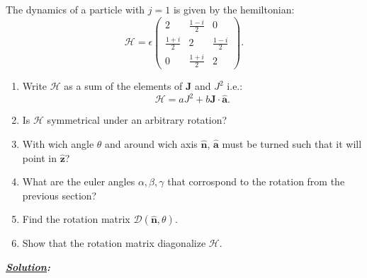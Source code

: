 \documentclass[notitlepage]{report}
\begin{document}
\begin{question}[title = Question 6]{}{}
The dynamics of a particle with  $j=1$ is given by the hemiltonian:\\
\[
	\mathcal{H}=\epsilon
	\begin{pmatrix}
		2 & \frac{1-i}{2} & 0\\
		\frac{1+i}{2} & 2 &\frac{1-i}{2}\\
		0 & \frac{1+i}{2} & 2
	\end{pmatrix}
.\] 
\begin{enumerate}[label=\alph*)]
	\item Write $\mathcal{H}$ as a sum of the elements of $\boldsymbol{J}$ and $J^2$ i.e.:\\
		\[
			\mathcal{H}=aJ^2+b \boldsymbol{J}\cdot \hat{\boldsymbol{a}}
		.\] 
	\item Is $\mathcal{H}$ symmetrical under an arbitrary rotation?
	\item With wich angle $\theta$ and around wich axis $\hat{\boldsymbol{n}}$, $\hat{\boldsymbol{a}}$ must be turned such that it will point in $\hat{\boldsymbol{z}}$?
	\item What are the euler angles $\alpha,\beta,\gamma$ that corrospond to the rotation from the previous section?
	\item Find the rotation matrix $\mathcal{D}\left(\hat{\boldsymbol{n}},\theta\right) $.
	\item Show that the rotation matrix diagonalize $\mathcal{H}$.
\end{enumerate}
\end{question}
\textbf{\emph{\underline{Solution}:}}\\
\end{document}
